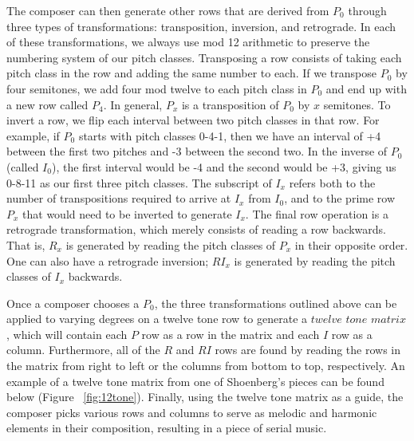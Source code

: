 The composer can then generate other rows that are derived from $P_0$ through three 
types of transformations: transposition, inversion, and retrograde. In each of these 
transformations, we always use mod 12 arithmetic to preserve the numbering system of 
our pitch classes. Transposing a row consists of taking each pitch class in the row and 
adding the same number to each. If we transpose $P_0$ by four semitones, we add four mod 
twelve to each pitch class in $P_0$ and end up with a new row called $P_4$. In general, $P_x$ 
is a transposition of $P_0$ by $x$ semitones. To invert a row, we flip each interval between two 
pitch classes in that row. For example, if $P_0$ starts with pitch classes 0-4-1, then 
we have an interval of +4 between the first two pitches and -3 between the second two. 
In the inverse of $P_0$ (called $I_0$), the first interval would be -4 and the second would
be +3, giving us 0-8-11 as our first three pitch classes. The subscript of $I_x$  refers 
both to the number of transpositions required to arrive at $I_x$ from $I_0$, and to the 
prime row $P_x$ that would need to be inverted to generate $I_x$. The final row operation 
is a retrograde transformation, which merely consists of reading a row backwards. That is, $R_x$
is generated by reading the pitch classes of $P_x$ in their opposite order. One can also 
have a retrograde inversion; $RI_x$ is generated by reading the pitch classes of $I_x$ backwards.

Once a composer chooses a $P_0$, the three transformations outlined above can be applied 
to varying degrees on a twelve tone row to generate a $twelve$ $tone$ $matrix$,
which will contain each $P$ row 
as a row in the matrix and each $I$ row as a column. Furthermore, all of the $R$ and $RI$
rows are found by reading the rows in the matrix from right to left or the columns 
from bottom to top, respectively. An example of a twelve tone matrix from one of Shoenberg's 
pieces can be found below (Figure ~\ref{fig:12tone}). Finally, using the twelve tone 
matrix as a guide, the composer picks various rows and columns to serve as melodic and 
harmonic elements in their composition, resulting in a piece of serial music.

